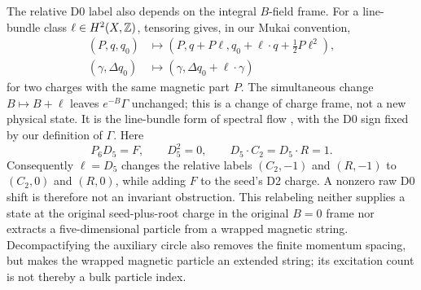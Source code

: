 The relative D0 label also depends on the integral $B$-field frame.
For a line-bundle class $\ell\in H^2(X,\mathbb Z)$, tensoring gives, in our
Mukai convention,
\begin{equation}
 \begin{aligned}
 (P,q,q_0)&\longmapsto
 (P,q+P\ell,q_0+\ell\cdot q+\tfrac12P\ell^2),\\
 (\gamma,\Delta q_0)&\longmapsto
 (\gamma,\Delta q_0+\ell\cdot\gamma)
 \end{aligned}
 \label{eq:x9-probe-spectral-flow}
\end{equation}
for two charges with the same magnetic part $P$.
The simultaneous change $B\mapsto B+\ell$ leaves
$e^{-B}\Gamma$ unchanged; this is a change of charge frame, not a
new physical state. It is the line-bundle form of spectral flow
\cite[eq.~(2.7)]{Alim:2010M5}, with the D0 sign fixed by our
definition of $\Gamma$.
Here
\begin{equation}
 P_6D_5=F,\qquad D_5^2=0,\qquad
 D_5\cdot C_2=D_5\cdot R=1.
 \label{eq:x9-probe-flow-class}
\end{equation}
Consequently $\ell=D_5$ changes the relative labels $(C_2,-1)$ and
$(R,-1)$ to $(C_2,0)$ and $(R,0)$, while adding $F$ to the seed's
D2 charge. A nonzero raw D0 shift is therefore not an invariant
obstruction. This relabeling neither supplies a state at the original
seed-plus-root charge in the original $B=0$ frame nor extracts a
five-dimensional particle from a wrapped magnetic string.
Decompactifying the auxiliary circle also removes the finite momentum
spacing, but makes the wrapped magnetic particle an extended string;
its excitation count is not thereby a bulk particle index.

